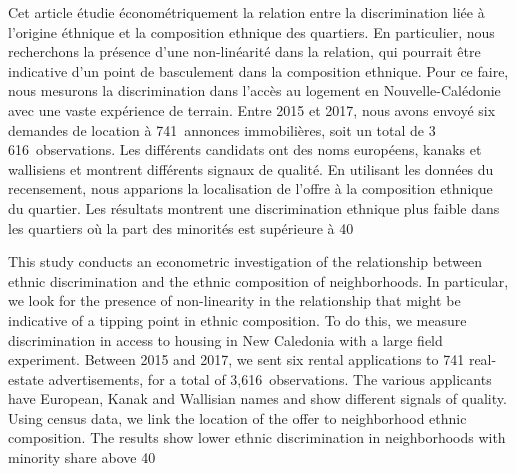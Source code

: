 \documentclass[10pt]{Revue-economique} %
\begin{document}


\begin{resume}
    Cet article étudie économétriquement la relation entre la discrimination liée à l’origine éthnique et la composition ethnique des quartiers. En particulier, nous recherchons la présence d’une non-linéarité dans la relation, qui pourrait être indicative d’un point de basculement dans la composition ethnique. Pour ce faire, nous mesurons la discrimination dans l’accès au logement en Nouvelle-Calédonie avec une vaste expérience de terrain. Entre 2015 et 2017, nous avons envoyé six demandes de location à 741 annonces immobilières, soit un total de 3 616 observations. Les différents candidats ont des noms européens, kanaks et wallisiens et montrent différents signaux de qualité. En utilisant les données du recensement, nous apparions la localisation de l’offre à la composition ethnique du quartier. Les résultats montrent une discrimination ethnique plus faible dans les quartiers où la part des minorités est supérieure à 40 %
\end{resume}


\begin{resumeENG}
    This study conducts an econometric investigation of the relationship between ethnic discrimination and the ethnic composition of neighborhoods. In particular, we look for the presence of non-linearity in the relationship that might be indicative of a tipping point in ethnic composition. To do this, we measure discrimination in access to housing in New Caledonia with a large field experiment. Between 2015 and 2017, we sent six rental applications to 741 real-estate advertisements, for a total of 3,616 observations. The various applicants have European, Kanak and Wallisian names and show different signals of quality. Using census data, we link the location of the offer to neighborhood ethnic composition. The results show lower ethnic discrimination in neighborhoods with minority share above 40%
\end{resumeENG}
\end{document}
